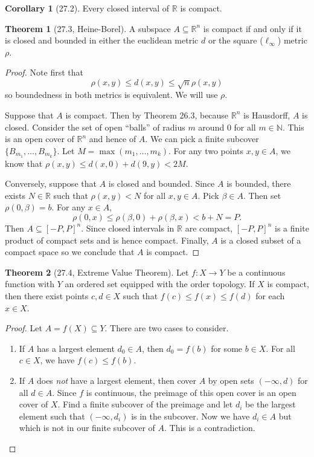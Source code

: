 \documentclass{article}
\newcommand{\nline}{\vspace*{0.5\baselineskip}}
\theoremstyle{definition}
\newtheorem{theorem}{Theorem}[subsection]
\newtheorem{corollary}{Corollary}[subsection]
\begin{document}
\begin{flushleft}
\begin{corollary}[27.2]
Every closed interval of $\mathbb{R}$ is compact.
\end{corollary}

\begin{theorem}[27.3, Heine-Borel]
A subspace $A \subseteq \mathbb{R}^n$ is compact if and only if it is closed and bounded in either the euclidean metric $d$ or the square ($\ell_\infty$) metric $\rho$.
\end{theorem}

\begin{proof}
Note first that
\[
\rho(x,y) \leq d(x,y) \leq \sqrt{n} \rho (x,y)
\]
so boundedness in both metrics is equivalent. We will use $\rho$.

\nline

Suppose that $A$ is compact. Then by Theorem 26.3, because $\mathbb{R}^n$ is Hausdorff, $A$ is closed. Consider the set of open ``balls'' of radius $m$ around $0$ for all $m \in \mathbb{N}$. This is an open cover of $\mathbb{R}^n$ and hence of $A$. We can pick a finite subcover $\{B_{m_1},\dots,B_{m_k}\}$. Let $M = \max(m_1,\dots,m_k)$. For any two points $x,y \in A$, we know that $\rho(x,y) \leq d(x,0) + d(9,y) < 2M$.

\nline

Conversely, suppose that $A$ is closed and bounded. Since $A$ is bounded, there exists $N \in \mathbb{R}$ such that $\rho(x,y) < N$ for all $x,y \in A$. Pick $\beta \in A$. Then set $\rho(0, \beta) = b$. For any $x \in A$,
\[
\rho(0, x) \leq \rho(\beta, 0) + \rho(\beta, x) < b + N = P.
\]
Then $A \subseteq [-P, P]^n$. Since closed intervals in $\mathbb{R}$ are compact, $[-P,P]^n$ is a finite product of compact sets and is hence compact. Finally, $A$ is a closed subset of a compact space so we conclude that $A$ is compact.
\end{proof}

\begin{theorem}[27.4, Extreme Value Theorem]
Let $f : X \to Y$ be a continuous function with $Y$ an ordered set equipped with the order topology. If $X$ is compact, then there exist points $c, d \in X$ such that $f(c) \leq f(x) \leq f(d)$ for each $x \in X$.
\end{theorem}

\begin{proof}
Let $A = f(X) \subseteq Y$. There are two cases to consider.
\begin{enumerate}
    \item If $A$ has a largest element $d_0 \in A$, then $d_0 = f(b)$ for some $b \in X$. For all $c \in X$, we have $f(c) \leq f(b)$.
    \item If $A$ does \textit{not} have a largest element, then cover $A$ by open sets $(-\infty, d)$ for all $d \in A$. Since $f$ is continuous, the preimage of this open cover is an open cover of $X$. Find a finite subcover of the preimage and let $d_i$ be the largest element such that $(-\infty, d_i)$ is in the subcover. Now we have $d_i \in A$ but which is not in our finite subcover of $A$. This is a contradiction.
\end{enumerate}
\end{proof}


\end{flushleft}
\end{document}
